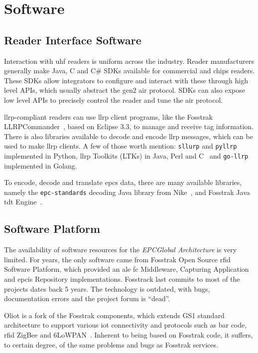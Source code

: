 \section{Software}

\subsection{Reader Interface Software}

Interaction with \ac{uhf} readers is uniform across the industry.
Reader manufacturers generally make Java, C\+\+ and C\# SDKs available for commercial and chips readers. These SDKs allow integrators to configure and interact with these through high level APIs, which usually abstract the \ac{gen2} air protocol. SDKs can also expose low level APIs to precisely control the reader and tune the air protocol.

\ac{llrp}-compliant readers can use \ac{llrp} client programs, like the Fosstrak LLRPCommander~\cite{FosstrakLLRPCommander}, based on Eclipse 3.3, to manage and receive tag information. 
There is also libraries available to decode and encode \ac{llrp} messages, which can be used to make \ac{llrp} clients. A few of those worth mention: \texttt{sllurp} and \texttt{pyllrp} implemented in Python, \ac{llrp} Toolkits (LTKs) in Java, Perl and C\+\+~\cite{LlrpOrga} and \texttt{go-llrp} implemented in Golang.

To encode, decode and translate \acp{epc} data, there are many available libraries, namely the \texttt{epc-standards} decoding Java library from Nike~\cite{NikeIncEpcstandards2019}, and Fosstrak Java \ac{tdt} Engine~\cite{FosstrakTagData}.

\subsection{Software Platform} \label{sec:softwareplatformoptions}

The availability of software resources for the \emph{EPCGlobal Architecture} is very limited.
For years, the only software came from Fosstrak Open Source \ac{rfid} Software Platform, which provided an \ac{ale} \ac{fc} Middleware, Capturing Application and \ac{epcis} Repository implementations. Fosstrack last commits to most of the projects dates back 5 years. The technology is outdated, with bugs, documentation errors and the project forum is ``dead''.

Oliot is a fork of the Fosstrak components, which extends GS1 standard architecture to support various \ac{iot} connectivity and protocols such as bar code, \ac{rfid} ZigBee and 6LoWPAN~\cite{OpenLanguageInternet}. Inherent to being based on Fosstrak code, it suffers, to certain degree, of the same problems and bugs as Fosstrak services.

